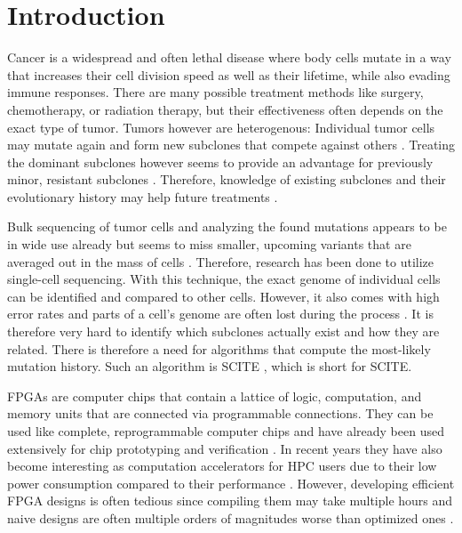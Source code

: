 \chapter{Introduction}
\label{ch:introduction}

Cancer is a widespread and often lethal disease\cite{10.1001/jamaoncol.2021.6987} where body cells mutate in a way that increases their cell division speed as well as their lifetime, while also evading immune responses. There are many possible treatment methods like surgery, chemotherapy, or radiation therapy, but their effectiveness often depends on the exact type of tumor. Tumors however are heterogenous: Individual tumor cells may mutate again and form new subclones that compete against others \cite{nik2012life}. Treating the dominant subclones however seems to provide an advantage for previously minor, resistant subclones \cite{gillies2012evolutionary}. Therefore, knowledge of existing subclones and their evolutionary history may help future treatments \cite{greaves2012clonal, stratton2009cancer, swanton2012intratumor}.

Bulk sequencing of tumor cells and analyzing the found mutations appears to be in wide use already but seems to miss smaller, upcoming variants that are averaged out in the mass of cells \cite{navin2014cancer}. Therefore, research has been done to utilize single-cell sequencing. With this technique, the exact genome of individual cells can be identified and compared to other cells. However, it also comes with high error rates and parts of a cell's genome are often lost during the process \cite{tree2016}. It is therefore very hard to identify which subclones actually exist and how they are related. There is therefore a need for algorithms that compute the most-likely mutation history. Such an algorithm is \acs{SCITE} \cite{tree2016}, which is short for \acl{SCITE}.

\acp{FPGA} are computer chips that contain a lattice of logic, computation, and memory units that are connected via programmable connections. They can be used like complete, reprogrammable computer chips and have already been used extensively for chip prototyping and verification \cite{rodriguez2007features}. In recent years they have also become interesting as computation accelerators for \ac{HPC} users due to their low power consumption compared to their performance \cite{betkaoui2010comparing}. However, developing efficient \ac{FPGA} designs is often tedious since compiling them may take multiple hours and naive designs are often multiple orders of magnitudes worse than optimized ones \cite{betkaoui2010comparing}.

